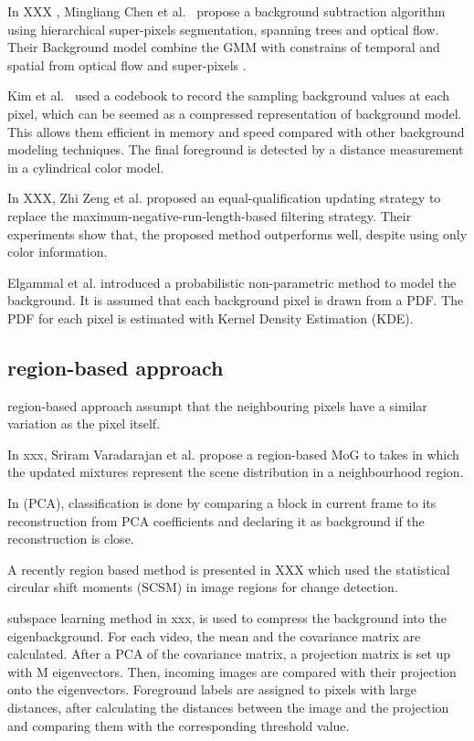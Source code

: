 \documentclass[journal]{IEEEtran}
\begin{document}
In XXX , Mingliang Chen et al.\ \cite{2017_TPAMI_GANGWANG} propose a background subtraction algorithm using hierarchical super-pixels segmentation, spanning trees and optical flow.
Their Background model combine the GMM with constrains of temporal and spatial from optical flow and super-pixels \cite{6205760_2012_TPAMI}.

Kim et al.\ \cite{Kim2004} used a codebook to record the sampling background values at each pixel, which can be seemed as a compressed representation of background model.
This allows them efficient in memory and speed compared with other background modeling techniques.
The final foreground is detected by a distance measurement in a cylindrical color model.

In XXX, Zhi Zeng et al.
proposed an equal-qualification updating strategy to replace the maximum-negative-run-length-based filtering strategy.
Their experiments show that, the proposed method outperforms well, despite using only color information.

Elgammal et al.
introduced a probabilistic non-parametric method to model the background.
It is assumed that each background pixel is drawn from a PDF.
The PDF for each pixel is estimated with Kernel Density Estimation (KDE).



\subsection{region-based approach}
\label{sec_geo}
region-based approach assumpt that the neighbouring pixels have a similar variation as the pixel itself.

In xxx, Sriram Varadarajan et al.
propose a region-based MoG to takes in which the updated mixtures represent the scene distribution in a neighbourhood region.

In (PCA), classification is done by comparing a block in current frame to its reconstruction from PCA coefficients and declaring it as background if the reconstruction is close.

A recently region based method is presented in XXX which used the statistical circular shift moments (SCSM) in image regions for change detection.

subspace learning method in xxx, is used to compress the background into the eigenbackground.
For each video, the mean and the covariance matrix are calculated.
After a PCA of the covariance matrix, a projection matrix is set up with M eigenvectors.
Then, incoming images are compared with their projection onto the eigenvectors.
Foreground labels are assigned to pixels with large distances, after calculating the distances between the image and the projection and comparing them with the corresponding threshold value.
\end{document}
